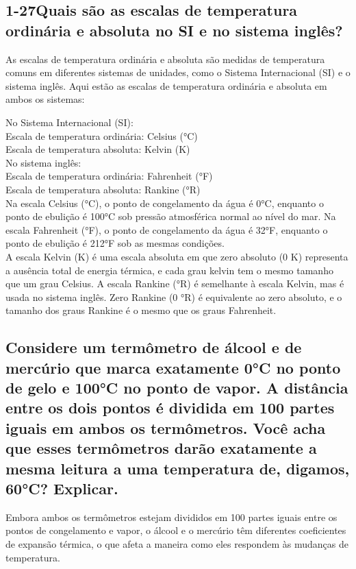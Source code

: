 \documentclass{article}
\begin{document}
\subsection*{1-27Quais são as escalas de temperatura ordinária e absoluta no SI e no sistema inglês?}
As escalas de temperatura ordinária e absoluta são medidas de temperatura comuns em diferentes sistemas de unidades, como o Sistema Internacional (SI) e o sistema inglês. Aqui estão as escalas de temperatura ordinária e absoluta em ambos os sistemas:

No Sistema Internacional (SI):\\

Escala de temperatura ordinária: Celsius (°C)\\
Escala de temperatura absoluta: Kelvin (K)\\
No sistema inglês:\\

Escala de temperatura ordinária: Fahrenheit (°F)\\
Escala de temperatura absoluta: Rankine (°R)\\
Na escala Celsius (°C), o ponto de congelamento da água é 0°C, enquanto o ponto de ebulição é 100°C sob pressão atmosférica normal ao nível do mar. Na escala Fahrenheit (°F), o ponto de congelamento da água é 32°F, enquanto o ponto de ebulição é 212°F sob as mesmas condições.\\

A escala Kelvin (K) é uma escala absoluta em que zero absoluto (0 K) representa a ausência total de energia térmica, e cada grau kelvin tem o mesmo tamanho que um grau Celsius. A escala Rankine (°R) é semelhante à escala Kelvin, mas é usada no sistema inglês. Zero Rankine (0 °R) é equivalente ao zero absoluto, e o tamanho dos graus Rankine é o mesmo que os graus Fahrenheit.\\

\subsection*{Considere um termômetro de álcool e de mercúrio que marca exatamente 0°C no ponto de gelo e 100°C no ponto de vapor. A distância entre os dois pontos é dividida em 100 partes iguais em ambos os termômetros. Você acha que esses termômetros darão exatamente a mesma leitura a uma temperatura de, digamos, 60°C? Explicar.}
Embora ambos os termômetros estejam divididos em 100 partes iguais entre os pontos de congelamento e vapor, o álcool e o mercúrio têm diferentes coeficientes de expansão térmica, o que afeta a maneira como eles respondem às mudanças de temperatura.
\end{document}
